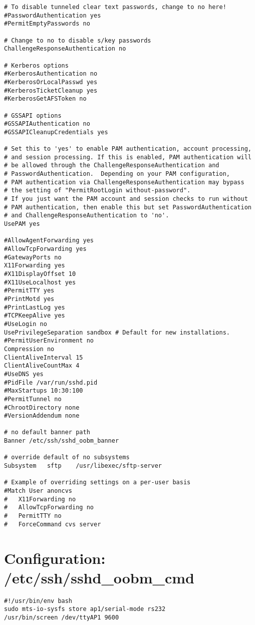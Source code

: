 \begin{verbatim}
# To disable tunneled clear text passwords, change to no here!
#PasswordAuthentication yes
#PermitEmptyPasswords no

# Change to no to disable s/key passwords
ChallengeResponseAuthentication no

# Kerberos options
#KerberosAuthentication no
#KerberosOrLocalPasswd yes
#KerberosTicketCleanup yes
#KerberosGetAFSToken no

# GSSAPI options
#GSSAPIAuthentication no
#GSSAPICleanupCredentials yes

# Set this to 'yes' to enable PAM authentication, account processing,
# and session processing. If this is enabled, PAM authentication will
# be allowed through the ChallengeResponseAuthentication and
# PasswordAuthentication.  Depending on your PAM configuration,
# PAM authentication via ChallengeResponseAuthentication may bypass
# the setting of "PermitRootLogin without-password".
# If you just want the PAM account and session checks to run without
# PAM authentication, then enable this but set PasswordAuthentication
# and ChallengeResponseAuthentication to 'no'.
UsePAM yes

#AllowAgentForwarding yes
#AllowTcpForwarding yes
#GatewayPorts no
X11Forwarding yes
#X11DisplayOffset 10
#X11UseLocalhost yes
#PermitTTY yes
#PrintMotd yes
#PrintLastLog yes
#TCPKeepAlive yes
#UseLogin no
UsePrivilegeSeparation sandbox # Default for new installations.
#PermitUserEnvironment no
Compression no
ClientAliveInterval 15
ClientAliveCountMax 4
#UseDNS yes
#PidFile /var/run/sshd.pid
#MaxStartups 10:30:100
#PermitTunnel no
#ChrootDirectory none
#VersionAddendum none

# no default banner path
Banner /etc/ssh/sshd_oobm_banner

# override default of no subsystems
Subsystem	sftp	/usr/libexec/sftp-server

# Example of overriding settings on a per-user basis
#Match User anoncvs
#	X11Forwarding no
#	AllowTcpForwarding no
#	PermitTTY no
#	ForceCommand cvs server
\end{verbatim}

\section{Configuration: /etc/ssh/sshd\_oobm\_cmd}
\label{section:appendix-ssh-sshdoobmcmd}
\begin{verbatim}
#!/usr/bin/env bash
sudo mts-io-sysfs store ap1/serial-mode rs232
/usr/bin/screen /dev/ttyAP1 9600
\end{verbatim}
